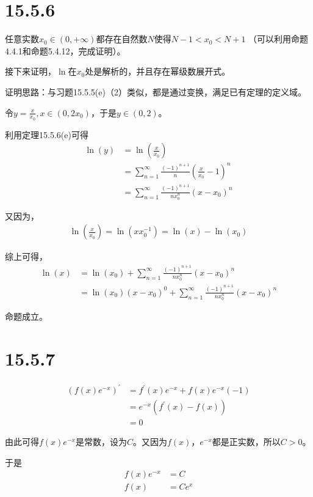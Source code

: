 \documentclass{article}
\begin{document}
\section*{15.5.6}

任意实数$x_0 \in (0, + \infty)$都存在自然数$N$使得$N - 1 < x_0 < N + 1$
（可以利用命题4.4.1和命题5.4.12，完成证明）。

接下来证明，$\ln$在$x_0$处是解析的，并且存在幂级数展开式。

证明思路：与习题15.5.5(e)（2）类似，都是通过变换，满足已有定理的定义域。

令$y = \frac{x}{x_0}, x \in (0, 2x_0)$，于是$y \in (0, 2)$。

利用定理15.5.6(e)可得
\begin{align*}
  \ln(y) & = \ln(\frac{x}{x_0})                                                       \\
         & = \sum \limits_{n = 1}^\infty \frac{(-1)^{n + 1}}{n} (\frac{x}{x_0} - 1)^n \\
         & = \sum \limits_{n = 1}^\infty \frac{(-1)^{n + 1}}{nx_0^n} (x - x_0)^n
\end{align*}

又因为，
\begin{align*}
  \ln(\frac{x}{x_0}) = \ln(xx_0^{-1}) = \ln(x) - \ln(x_0)
\end{align*}

综上可得，
\begin{align*}
  \ln(x) & = \ln(x_0) + \sum \limits_{n = 1}^\infty \frac{(-1)^{n + 1}}{nx_0^n} (x - x_0)^n            \\
         & = \ln(x_0)(x - x_0)^0 + \sum \limits_{n = 1}^\infty \frac{(-1)^{n + 1}}{nx_0^n} (x - x_0)^n
\end{align*}

命题成立。

\section*{15.5.7}
\begin{align*}
  (f(x)e^{-x})^\prime
   & = f^\prime(x) e^{-x} + f(x)e^{-x} (-1) \\
   & = e^{-x} (f^\prime(x) - f(x) )         \\
   & = 0
\end{align*}

由此可得$f(x)e^{-x}$是常数，设为$C$。又因为$f(x)$，$e^{-x}$都是正实数，所以$C > 0$。

于是
\begin{align*}
  f(x)e^{-x} & = C    \\
  f(x)       & = Ce^x
\end{align*}
\end{document}
